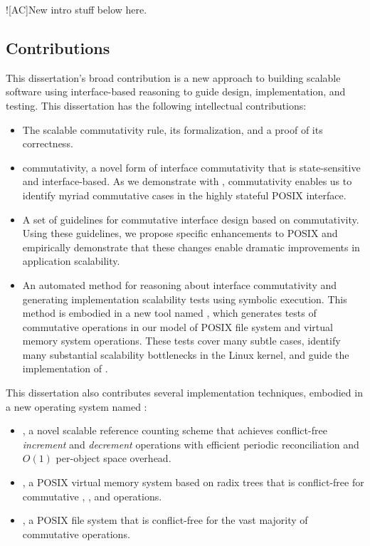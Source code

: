 \XXX![AC]{New intro stuff below here.}


\subsection{Contributions}

This dissertation's broad contribution is a new approach to building
scalable software using interface-based reasoning to guide design,
implementation, and testing.  This dissertation has the following
intellectual contributions:

\begin{itemize}

\item The scalable commutativity rule, its formalization, and a proof
  of its correctness.

\item \SIM commutativity, a novel form of interface commutativity that
  is state-sensitive and interface-based.  As we demonstrate with
  \tool, \SIM commutativity enables us to identify myriad commutative
  cases in the highly stateful POSIX interface.

\item A set of guidelines for commutative interface design based on
  \SIM commutativity.  Using these guidelines, we propose specific
  enhancements to POSIX and empirically demonstrate that these changes
  enable dramatic improvements in application scalability.

\item An automated method for reasoning about interface commutativity
  and generating implementation scalability tests using symbolic
  execution.  This method is embodied in a new tool named \tool, which
  generates  tests of commutative operations
  in our model of  POSIX file system and
  virtual memory system operations.  These tests cover many subtle
  cases, identify many substantial scalability bottlenecks in the
  Linux kernel, and guide the implementation of \sys.

\end{itemize}

This dissertation also contributes several implementation techniques,
embodied in a new operating system named \sys:

\begin{itemize}

\item {}, a novel scalable reference counting scheme that
  achieves conflict-free \emph{increment} and \emph{decrement}
  operations with efficient periodic reconciliation and $O(1)$
  per-object space overhead.

\item \vm, a POSIX virtual memory system based on radix trees that is
  conflict-free for commutative , , and
   operations.

\item \fs, a POSIX file system that is conflict-free for the vast
  majority of commutative operations.

\end{itemize}

